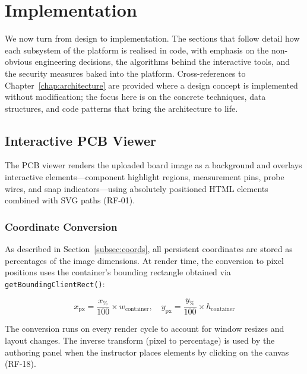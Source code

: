 \chapter{Implementation}\label{chap:implementation}

We now turn from design to implementation. The sections that follow detail how each subsystem of the \pcbctf{} platform is realised in code, with emphasis on the non-obvious engineering decisions, the algorithms behind the interactive tools, and the security measures baked into the platform. Cross-references to Chapter~\ref{chap:architecture} are provided where a design concept is implemented without modification; the focus here is on the concrete techniques, data structures, and code patterns that bring the architecture to life.

\section{Interactive PCB Viewer}\label{sec:pcb-viewer}

The PCB viewer renders the uploaded board image as a background and overlays interactive elements---component highlight regions, measurement pins, probe wires, and snap indicators---using absolutely positioned HTML elements combined with SVG paths (RF-01).

\subsection{Coordinate Conversion}\label{subsec:coord-conversion}

As described in Section~\ref{subsec:coords}, all persistent coordinates are stored as percentages of the image dimensions. At render time, the conversion to pixel positions uses the container's bounding rectangle obtained via \texttt{getBoundingClientRect()}:

\begin{equation}
    x_{\text{px}} = \frac{x_{\%}}{100} \times w_{\text{container}}, \quad
    y_{\text{px}} = \frac{y_{\%}}{100} \times h_{\text{container}}
\end{equation}

The conversion runs on every render cycle to account for window resizes and layout changes. The inverse transform (pixel to percentage) is used by the authoring panel when the instructor places elements by clicking on the canvas (RF-18).

